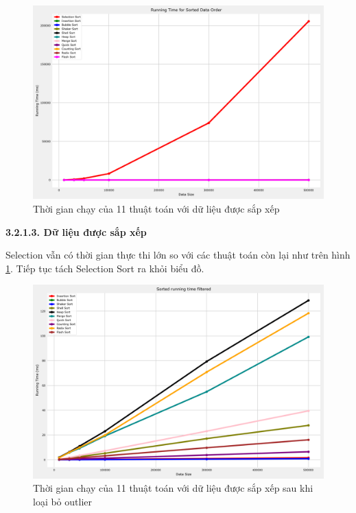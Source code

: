 \begin{figure}[H]
    \centering
    \includegraphics[width=\textwidth]{experimental_result/images/sorted_running_time.png}
    \caption{Thời gian chạy của 11 thuật toán với dữ liệu được sắp xếp}
    \label{fig:sorted_running_time}
\end{figure}

\textbf{3.2.1.3. Dữ liệu được sắp xếp}

Selection vẫn có thời gian thực thi lớn so với các thuật toán còn lại như trên hình \ref{fig:sorted_running_time}. Tiếp tục tách Selection Sort ra khỏi biểu đồ.

\begin{figure}[H]
    \centering
    \includegraphics[width=\textwidth]{experimental_result/images/sorted_running_time_filtered.png}
    \caption{Thời gian chạy của 11 thuật toán với dữ liệu được sắp xếp sau khi loại bỏ outlier}
    \label{fig:sorted_running_time_filtered}
\end{figure}

